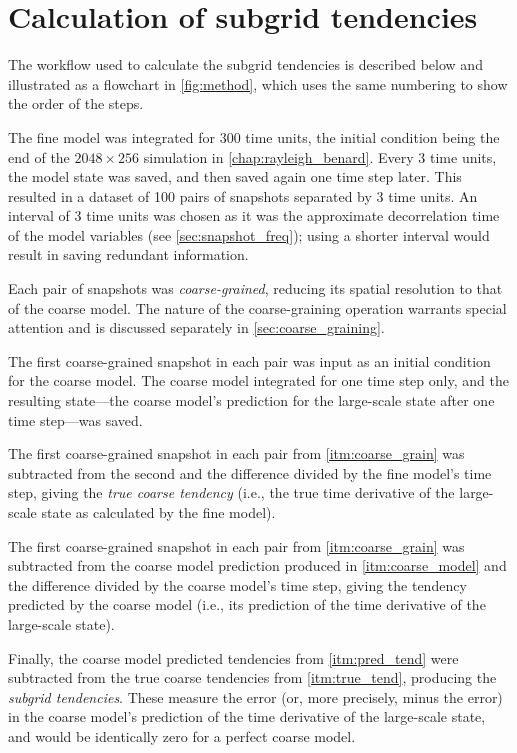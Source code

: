 \documentclass[../main.tex]{subfiles}
\begin{document}
\section{Calculation of subgrid tendencies} \label{sec:calculation}
The workflow used to calculate the subgrid tendencies is described below and
illustrated as a flowchart in \cref{fig:method}, which uses the same numbering
to show the order of the steps. 
\begin{steps}
    \item\label{itm:fine_model} The fine model was integrated for 300
        time units, the initial condition being the end of the $2048 \times
        256$ simulation in \cref{chap:rayleigh_benard}. Every 3 time units,
        the model state was saved, and then saved again one time step later.
        This resulted in a dataset of 100 pairs of snapshots separated by 3
        time units. An interval of 3 time units was chosen as it was the
        approximate decorrelation time of the model variables (see
        \cref{sec:snapshot_freq}); using a shorter interval would result in
        saving redundant information.
    \item\label{itm:coarse_grain} Each pair of snapshots was
        \emph{coarse-grained}, reducing its spatial resolution to that of the
        coarse model. The nature of the coarse-graining operation warrants
        special attention and is discussed separately in
        \cref{sec:coarse_graining}.
    \item\label{itm:coarse_model} The first coarse-grained snapshot in
        each pair was input as an initial condition for the coarse model. The
        coarse model integrated for one time step only, and the resulting
        state---the coarse model's prediction for the large-scale state after
        one time step---was saved.
    \item\label{itm:true_tend} The first coarse-grained snapshot in each
        pair from \cref{itm:coarse_grain} was subtracted from the second
        and the difference divided by the fine model's time step, giving the
        \emph{true coarse tendency} (i.e., the true time derivative of the
        large-scale state as calculated by the fine model).
    \item\label{itm:pred_tend} The first coarse-grained snapshot in each
        pair from \cref{itm:coarse_grain} was subtracted from the coarse model
        prediction produced in \cref{itm:coarse_model} and the difference
        divided by the coarse model's time step, giving the tendency predicted
        by the coarse model (i.e., its prediction of the time derivative of the
        large-scale state).
    \item\label{itm:subgrid_tend} Finally, the coarse model predicted
        tendencies from \cref{itm:pred_tend} were subtracted from the true
        coarse tendencies from \cref{itm:true_tend}, producing the
        \emph{subgrid tendencies}. These measure the error (or, more precisely,
        minus the error) in the coarse model's prediction of the time
        derivative of the large-scale state, and would be identically zero for
        a perfect coarse model.
\end{steps}
\end{document}
